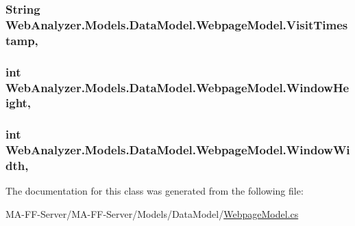 \subsubsection[{Visit\+Timestamp}]{\setlength{\rightskip}{0pt plus 5cm}String Web\+Analyzer.\+Models.\+Data\+Model.\+Webpage\+Model.\+Visit\+Timestamp\hspace{0.3cm}{\ttfamily [get]}, {\ttfamily [set]}}\label{class_web_analyzer_1_1_models_1_1_data_model_1_1_webpage_model_ac3378fdc78273706547ec3a9d377ef9a}
\hypertarget{class_web_analyzer_1_1_models_1_1_data_model_1_1_webpage_model_a76b6e0896f14f8d7c0d7bf94b94ec058}{}
\subsubsection[{Window\+Height}]{\setlength{\rightskip}{0pt plus 5cm}int Web\+Analyzer.\+Models.\+Data\+Model.\+Webpage\+Model.\+Window\+Height\hspace{0.3cm}{\ttfamily [get]}, {\ttfamily [set]}}\label{class_web_analyzer_1_1_models_1_1_data_model_1_1_webpage_model_a76b6e0896f14f8d7c0d7bf94b94ec058}
\hypertarget{class_web_analyzer_1_1_models_1_1_data_model_1_1_webpage_model_a3e3926562c05a94a3111f3a07cd8e131}{}
\subsubsection[{Window\+Width}]{\setlength{\rightskip}{0pt plus 5cm}int Web\+Analyzer.\+Models.\+Data\+Model.\+Webpage\+Model.\+Window\+Width\hspace{0.3cm}{\ttfamily [get]}, {\ttfamily [set]}}\label{class_web_analyzer_1_1_models_1_1_data_model_1_1_webpage_model_a3e3926562c05a94a3111f3a07cd8e131}


The documentation for this class was generated from the following file\+:\begin{DoxyCompactItemize}
\item 
M\+A-\/\+F\+F-\/\+Server/\+M\+A-\/\+F\+F-\/\+Server/\+Models/\+Data\+Model/\hyperlink{_webpage_model_8cs}{Webpage\+Model.\+cs}\end{DoxyCompactItemize}
